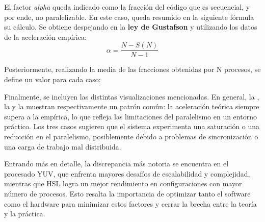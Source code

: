 El factor \textit{alpha} queda indicado como la fracción del código que es secuencial, y por ende, no paralelizable. En este caso, queda resumido en la siguiente fórmula su cálculo. Se obtiene despejando en la \textbf{ley de Gustafson} y utilizando los datos de la aceleración empírica:
\[
\alpha = \frac{N - S(N)}{N - 1}
\]

Posteriormente, realizando la media de las fracciones obtenidas por N procesos, se define un valor para cada caso:


Finalmente, se incluyen las distintas visualizaciones mencionadas. 
En general, la , la  y la  muestran respectivamente un patrón común: la aceleración teórica siempre supera a la empírica, lo que refleja las limitaciones del paralelismo en un entorno práctico. Los tres casos sugieren que el sistema experimenta una saturación o una reducción en el paralelismo, posiblemente debido a problemas de sincronización o una carga de trabajo mal distribuida. 

Entrando más en detalle, la discrepancia más notoria se encuentra en el procesado YUV, que enfrenta mayores desafíos de escalabilidad y complejidad, mientras que HSL logra un mejor rendimiento en configuraciones con mayor número de procesos. 
Esto resalta la importancia de optimizar tanto el software como el hardware para minimizar estos factores y cerrar la brecha entre la teoría y la práctica.

